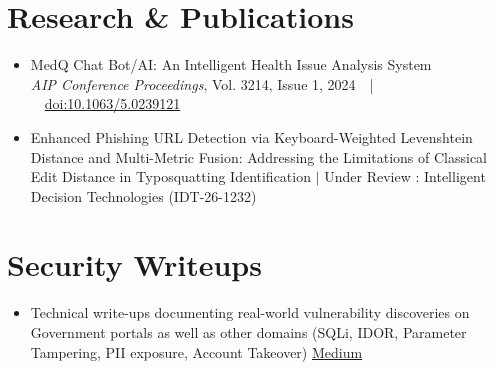 \documentclass[10pt,a4paper]{article}
\begin{document}
\section{Research \& Publications } 
\begin{itemize}
    \item {MedQ Chat Bot/AI: An Intelligent Health Issue Analysis System}\\
\textit{AIP Conference Proceedings}, Vol. 3214, Issue 1, 2024\ \ |\ \ \href{https://pubs.aip.org/aip/acp/article-abstract/3214/1/020042/3318705/MedQ-Chat-Bot-AI-An-intelligent-health-issue?redirectedFrom=fulltext}{doi:10.1063/5.0239121}\\
\end{itemize}
\begin{itemize}
    \item {Enhanced Phishing URL Detection via Keyboard-Weighted Levenshtein Distance and Multi-Metric Fusion: Addressing the Limitations of Classical Edit Distance in Typosquatting Identification $|$ Under Review :  Intelligent Decision Technologies (IDT-26-1232)}\\
\end{itemize}

\section{Security Writeups}
\begin{itemize}
    \item \noindent Technical write-ups documenting real-world vulnerability discoveries on Government 
portals as well as other domains (SQLi, IDOR, Parameter Tampering, PII exposure, Account Takeover) \hfill
\href{https://medium.com/@bagade1122} {Medium}
\end{itemize}
\end{document}
